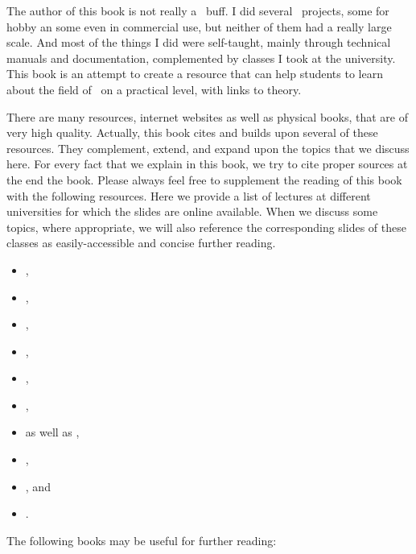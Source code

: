 %
\global\let\oldxyzglslink\glslink%
\protected\gdef\glslink#1#2{#2}%
%
The author of this book is not really a \db\ buff.
I did several \db\ projects, some for hobby an some even in commercial use, but neither of them had a really large scale.
And most of the things I did were self-taught, mainly through technical manuals and documentation, complemented by classes I took at the university.
This book is an attempt to create a resource that can help students to learn about the field of \dbs\ on a practical level, with links to theory.

There are many resources, internet websites as well as physical books, that are of very high quality.
Actually, this book cites and builds upon several of these resources.
They complement, extend, and expand upon the topics that we discuss here.
For every fact that we explain in this book, we try to cite proper sources at the end the book.
Please always feel free to supplement the reading of this book with the following resources.%
%
%
Here we provide a list of lectures at different universities for which the slides are online available.
When we discuss some topics, where appropriate, we will also reference the corresponding slides of these classes as easily-accessible and concise further reading.%
\begin{itemize}%
\item {},%
\item {},%
\item {},%
\item {},%
\item {},%
\item {},%
\item {} as well as ,%
\item {},%
\item {}, and%
\item {}.%
\end{itemize}%
\endhsection%
%
%
The following books may be useful for further reading:%
